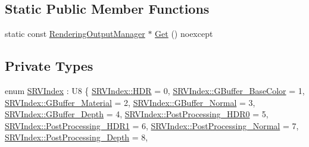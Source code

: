 \subsection*{Static Public Member Functions}
\begin{DoxyCompactItemize}
\item 
static const \hyperlink{classmage_1_1_rendering_output_manager}{Rendering\+Output\+Manager} $\ast$ \hyperlink{classmage_1_1_rendering_output_manager_afc3d9dcc274a281e26110f6b43ec6c62}{Get} () noexcept
\end{DoxyCompactItemize}
\subsection*{Private Types}
\begin{DoxyCompactItemize}
\item 
enum \hyperlink{classmage_1_1_rendering_output_manager_ab23ee4985ed0d176479fe796dc3a4cfd}{S\+R\+V\+Index} \+: U8 \{ \newline
\hyperlink{classmage_1_1_rendering_output_manager_ab23ee4985ed0d176479fe796dc3a4cfda6cad826248cd3f4e93da71e7b49928e3}{S\+R\+V\+Index\+::\+H\+DR} = 0, 
\hyperlink{classmage_1_1_rendering_output_manager_ab23ee4985ed0d176479fe796dc3a4cfdaf8aaa1436c06c671272ac08e4fa83309}{S\+R\+V\+Index\+::\+G\+Buffer\+\_\+\+Base\+Color} = 1, 
\hyperlink{classmage_1_1_rendering_output_manager_ab23ee4985ed0d176479fe796dc3a4cfdabbdd76532c820b05b242d544cd1b43fd}{S\+R\+V\+Index\+::\+G\+Buffer\+\_\+\+Material} = 2, 
\hyperlink{classmage_1_1_rendering_output_manager_ab23ee4985ed0d176479fe796dc3a4cfdaf69e4b1698bc66624ab45f2c967406bb}{S\+R\+V\+Index\+::\+G\+Buffer\+\_\+\+Normal} = 3, 
\newline
\hyperlink{classmage_1_1_rendering_output_manager_ab23ee4985ed0d176479fe796dc3a4cfdae8964b7cf20037a91a4e9107f2b93db8}{S\+R\+V\+Index\+::\+G\+Buffer\+\_\+\+Depth} = 4, 
\hyperlink{classmage_1_1_rendering_output_manager_ab23ee4985ed0d176479fe796dc3a4cfdaf86c3f35d502a4de4cc2d4601a6fbbc4}{S\+R\+V\+Index\+::\+Post\+Processing\+\_\+\+H\+D\+R0} = 5, 
\hyperlink{classmage_1_1_rendering_output_manager_ab23ee4985ed0d176479fe796dc3a4cfda2136232aa9456009a7df9de7db662322}{S\+R\+V\+Index\+::\+Post\+Processing\+\_\+\+H\+D\+R1} = 6, 
\hyperlink{classmage_1_1_rendering_output_manager_ab23ee4985ed0d176479fe796dc3a4cfda224be169fd2e0ce4f53c6afa41ac4fe9}{S\+R\+V\+Index\+::\+Post\+Processing\+\_\+\+Normal} = 7, 
\newline
\hyperlink{classmage_1_1_rendering_output_manager_ab23ee4985ed0d176479fe796dc3a4cfda251bebd0602960f976f4a69dff9b13fe}{S\+R\+V\+Index\+::\+Post\+Processing\+\_\+\+Depth} = 8, 

\end{DoxyCompactItemize}
